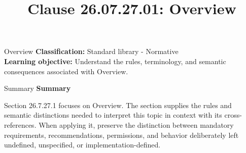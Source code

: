 \documentclass[10pt,letterpaper]{article}
\title{Clause 26.07.27.01: Overview}
\author{}
\date{}
\begin{document}
\maketitle
\begin{CornellOverviewBox}{Overview}
\textbf{Classification:} Standard library - Normative\\[2pt]
\textbf{Learning objective:} Understand the rules, terminology, and semantic consequences associated with Overview.
\end{CornellOverviewBox}\begin{CornellSummaryBox}{Summary}
{\sffamily\bfseries\color{Accent} Summary}\par\vspace{3pt}Section 26.7.27.1 focuses on Overview. The section supplies the rules and semantic distinctions needed to interpret this topic in context with its cross-references. When applying it, preserve the distinction between mandatory requirements, recommendations, permissions, and behavior deliberately left undefined, unspecified, or implementation-defined.
\end{CornellSummaryBox}
\end{document}
